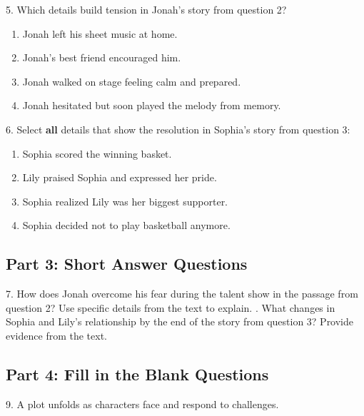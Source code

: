 \documentclass[12pt]{article}
\begin{document}
\vspace{1cm}

5. Which details build tension in Jonah’s story from question 2?  
\begin{enumerate}[label=\Alph*.]
    \item Jonah left his sheet music at home.  
    \item Jonah’s best friend encouraged him.  
    \item Jonah walked on stage feeling calm and prepared.  
    \item Jonah hesitated but soon played the melody from memory.  
\end{enumerate}

\vspace{1cm}

6. Select \textbf{all} details that show the resolution in Sophia’s story from question 3:  
\begin{enumerate}[label=\Alph*.]
    \item Sophia scored the winning basket.  
    \item Lily praised Sophia and expressed her pride.  
    \item Sophia realized Lily was her biggest supporter.  
    \item Sophia decided not to play basketball anymore.  
\end{enumerate}

\vspace{1cm}

\subsection*{Part 3: Short Answer Questions}

7. How does Jonah overcome his fear during the talent show in the passage from question 2? Use specific details from the text to explain.  
\vspace{4cm}
. What changes in Sophia and Lily’s relationship by the end of the story from question 3? Provide evidence from the text.  
\vspace{4cm}

\subsection*{Part 4: Fill in the Blank Questions}
\vspace{1cm}
9. A plot unfolds as characters face \underline{\hspace{4cm}} and respond to challenges.  
\vspace{2cm}
\end{document}
